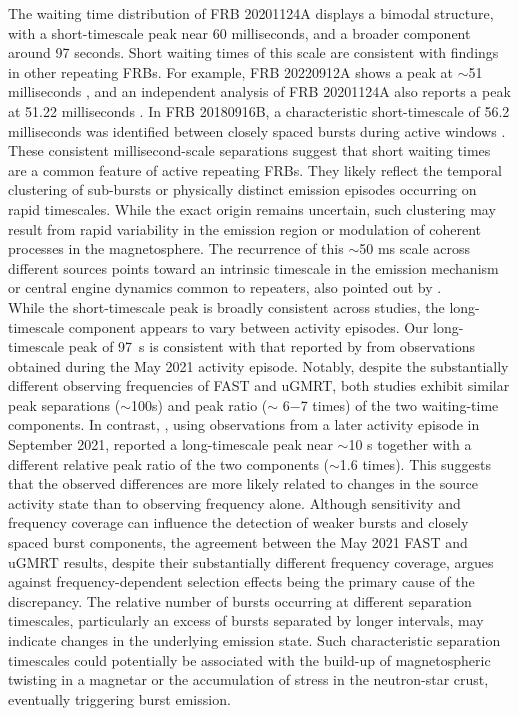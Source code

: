 \documentclass[preprint2, trackchanges]{aastex631}
\begin{document}

The waiting time distribution of FRB 20201124A displays a bimodal structure, with a short-timescale peak near 60 milliseconds, and a broader component around 97 seconds. Short waiting times of this scale are consistent with findings in other repeating FRBs. For example, FRB 20220912A shows a peak at $\sim$51 milliseconds \citep{Zhang_2023}, and an independent analysis of FRB 20201124A also reports a peak at 51.22 milliseconds \citep{Zhang_2022}. In FRB 20180916B, a characteristic short-timescale of 56.2 milliseconds was identified between closely spaced bursts during active windows \citep{2023MNRAS.524..569W}.
\\
These consistent millisecond-scale separations suggest that short waiting times are a common feature of active repeating FRBs. They likely reflect the temporal clustering of sub-bursts or physically distinct emission episodes occurring on rapid timescales. While the exact origin remains uncertain, such clustering may result from rapid variability in the emission region or modulation of coherent processes in the magnetosphere. The recurrence of this $\sim$50 ms scale across different sources points toward an intrinsic timescale in the emission mechanism or central engine dynamics common to repeaters, also pointed out by \citet{Zhang_2023}.
\\
While the short-timescale peak is broadly consistent across studies, the long-timescale component appears to vary between activity episodes. Our long-timescale peak of 97~s is consistent with that reported by \citet{Xu2022} from observations obtained during the May 2021 activity episode. Notably, despite the substantially different observing frequencies of FAST and uGMRT, both studies exhibit similar peak separations ($\sim$100s) and peak ratio ($\sim$ 6$-$7 times) of the two waiting-time components. In contrast, \citet{Zhang_2022}, using observations from a later activity episode in September 2021, reported a long-timescale peak near $\sim$10 s together with a different relative peak ratio of the two components ($\sim$1.6 times). This suggests that the observed differences are more likely related to changes in the source activity state than to observing frequency alone. Although sensitivity and frequency coverage can influence the detection of weaker bursts and closely spaced burst components, the agreement between the May 2021 FAST and uGMRT results, despite their substantially different frequency coverage, argues against frequency-dependent selection effects being the primary cause of the discrepancy. The relative number of bursts occurring at different separation timescales, particularly an excess of bursts separated by longer intervals, may indicate changes in the underlying emission state. Such characteristic separation timescales could potentially be associated with the build-up of magnetospheric twisting in a magnetar or the accumulation of stress in the neutron-star crust, eventually triggering burst emission.
\end{document}
